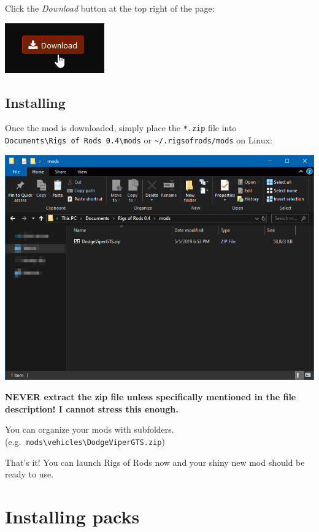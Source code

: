 Click the \emph{Download} button at the top right of the page:

\includegraphics{images/repository-download.png}

\hypertarget{installing}{%
\subsection{Installing}\label{installing}}

Once the mod is downloaded, simply place the \texttt{*.zip} file into
\texttt{Documents\textbackslash{}Rigs\ of\ Rods\ 0.4\textbackslash{}mods}
or \texttt{\textasciitilde{}/.rigsofrods/mods} on Linux:

\includegraphics{images/repository-installing-mod.png}

\textbf{NEVER extract the zip file unless specifically mentioned in the
file description! I cannot stress this enough.}

You can organize your mods with subfolders.
(e.g.~\texttt{mods\textbackslash{}vehicles\textbackslash{}DodgeViperGTS.zip})

That's it! You can launch Rigs of Rods now and your shiny new mod should
be ready to use.

\hypertarget{installing-packs}{%
\section{Installing packs}\label{installing-packs}}

